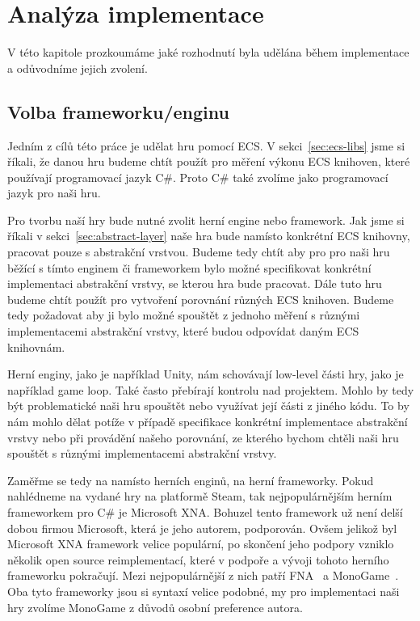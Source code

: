 \chapter{Analýza implementace}
V této kapitole prozkoumáme jaké rozhodnutí byla udělána během implementace a odůvodníme jejich zvolení.


\section{Volba frameworku/enginu}
Jedním z cílů této práce je udělat hru pomocí ECS. V sekci~\ref{sec:ecs-libs} jsme si říkali, že danou hru budeme chtít použít pro měření výkonu ECS knihoven, které používají programovací jazyk C\#. Proto C\# také zvolíme jako programovací jazyk pro naši hru. 

Pro tvorbu naší hry bude nutné zvolit herní engine nebo framework. Jak jsme si říkali v sekci~\ref{sec:abstract-layer} naše hra bude namísto konkrétní ECS knihovny, pracovat pouze s abstrakční vrstvou. Budeme tedy chtít aby pro pro naši hru běžící s tímto enginem či frameworkem bylo možné specifikovat konkrétní implementaci abstrakční vrstvy, se kterou hra bude pracovat. Dále tuto hru budeme chtít použít pro vytvoření porovnání různých ECS knihoven. Budeme tedy požadovat aby ji bylo možné spouštět z jednoho měření s různými implementacemi abstrakční vrstvy, které budou odpovídat daným ECS knihovnám.

Herní enginy, jako je například Unity, nám schovávají low-level části hry, jako je například game loop. Také často přebírají kontrolu nad projektem. Mohlo by tedy být problematické naši hru spouštět nebo využívat její části z jiného kódu. To by nám mohlo dělat potíže v případě specifikace konkrétní implementace abstrakční vrstvy nebo při provádění našeho porovnání, ze kterého bychom chtěli naši hru spouštět s různými implementacemi abstrakční vrstvy.

Zaměřme se tedy na namísto herních enginů, na herní frameworky. Pokud nahlédneme na vydané hry na platformě Steam, tak nejpopulárnějším herním frameworkem pro C\# je Microsoft XNA. Bohuzel tento framework už není delší dobou firmou Microsoft, která je jeho autorem, podporován. Ovšem jelikož byl Microsoft XNA framework velice populární, po skončení jeho podpory vzniklo několik open source reimplementací, které v podpoře a vývoji tohoto herního frameworku pokračují. Mezi nejpopulárnější z nich patří FNA~\cite{FNA} a MonoGame~\cite{MonoGame}. Oba tyto frameworky jsou si syntaxí velice podobné, my pro implementaci naši hry zvolíme MonoGame z důvodů osobní preference autora.

